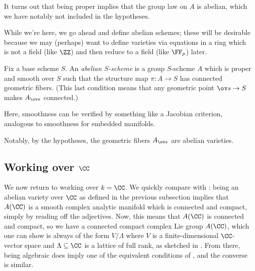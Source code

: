 \documentclass[../notes.tex]{subfiles}
\begin{document}
\begin{remark} \label{rem:ab-var-is-ab}
	It turns out that being proper implies that the group law on $A$ is abelian, which we have notably not included in the hypotheses.
\end{remark}
While we're here, we go ahead and define abelian schemes; these will be desirable because we may (perhaps) want to define varieties via equations in a ring which is not a field (like $\ZZ$) and then reduce to a field (like $\FF_p$) later.
\begin{definition}
	Fix a base scheme $S$. An \textit{abelian $S$-scheme} is a group $S$-scheme $A$ which is proper and smooth over $S$ such that the structure map $\pi\colon A\to S$ has connected geometric fibers. (This last condition means that any geometric point $\ov s\to S$ makes $A_{\ov s}$ connected.)
\end{definition}
\begin{remark}
	Here, smoothness can be verified by something like a Jacobian criterion, analogous to smoothness for embedded manifolds.
\end{remark}
\begin{remark}
	Notably, by the hypotheses, the geometric fibers $A_{\ov s}$ are abelian varieties.
\end{remark}

\subsection{Working over \texorpdfstring{$\CC$}{C}}
We now return to working over $k=\CC$. We quickly compare with : being an abelian variety over $\CC$ as defined in the previous subsection implies that $A(\CC)$ is a smooth complex analytic manifold which is connected and compact, simply by reading off the adjectives. Now, this means that $A(\CC)$ is connected and compact, so we have a connected compact complex Lie group $A(\CC)$, which one can show is always of the form $V/\Lambda$ where $V$ is a finite-dimensional $\CC$-vector space and $\Lambda\subseteq\CC$ is a lattice of full rank, as sketched in . From there, being algebraic does imply one of the equivalent conditions of , and the converse is similar.
\end{document}
